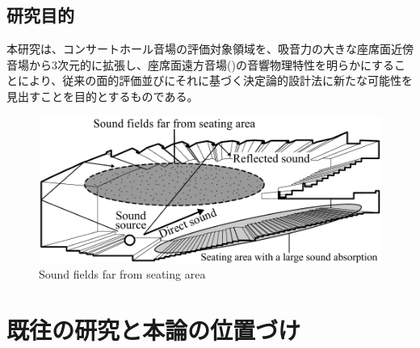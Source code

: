 \subsection{研究目的}
本研究は、コンサートホール音場の評価対象領域を、吸音力の大きな座席面近傍音場から3次元的に拡張し、座席面遠方音場()の音響物理特性を明らかにすることにより、従来の面的評価並びにそれに基づく決定論的設計法に新たな可能性を見出すことを目的とするものである。
\begin{figure}[htbp]
    \centering
    \includegraphics[keepaspectratio,scale=0.8]{01_att/zasekimen_enpo_English.pdf}
    \caption{\hspace{1mm}Sound fields far from seating area}
    \label{fig:座席面遠方音場}
\end{figure}

\newpage
\section{既往の研究と本論の位置づけ}

